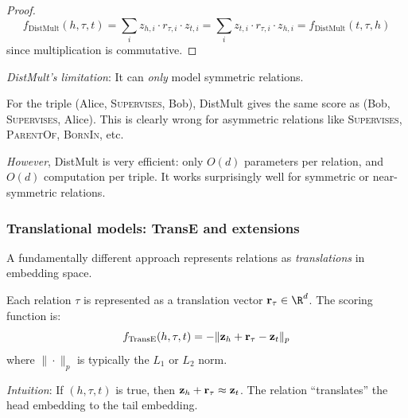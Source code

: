 \begin{notechapter}
\begin{proof}
\[
f_{\text{DistMult}}(h, \tau, t) = \sum_i z_{h,i} \cdot r_{\tau,i} \cdot z_{t,i} = \sum_i z_{t,i} \cdot r_{\tau,i} \cdot z_{h,i} = f_{\text{DistMult}}(t, \tau, h)
\]
since multiplication is commutative.
\end{proof}

\begin{keyidea}
\emph{DistMult's limitation}: It can \emph{only} model symmetric relations.

For the triple (Alice, \textsc{Supervises}, Bob), DistMult gives the same score as (Bob, \textsc{Supervises}, Alice). This is clearly wrong for asymmetric relations like \textsc{Supervises}, \textsc{ParentOf}, \textsc{BornIn}, etc.

\emph{However}, DistMult is very efficient: only $O(d)$ parameters per relation, and $O(d)$ computation per triple. It works surprisingly well for symmetric or near-symmetric relations.
\end{keyidea}


\subsubsection{Translational models: TransE and extensions}

A fundamentally different approach represents relations as \emph{translations} in embedding space.

\begin{definition}
Each relation $\tau$ is represented as a translation vector $\vect{r}_\tau \in \R^d$. The scoring function is:
\begin{equation}
f_{\text{TransE}}(h, \tau, t) = -\|\mathbf{z}_h + \mathbf{r}_\tau - \mathbf{z}_t\|_p
\end{equation}
where $\|\cdot\|_p$ is typically the $L_1$ or $L_2$ norm.

\emph{Intuition}: If $(h, \tau, t)$ is true, then $\mathbf{z}_h + \mathbf{r}_\tau \approx \mathbf{z}_t$. The relation ``translates'' the head embedding to the tail embedding.
\end{definition}

\begin{figure}[htbp]
\centering
{}
\end{figure}
\end{notechapter}
